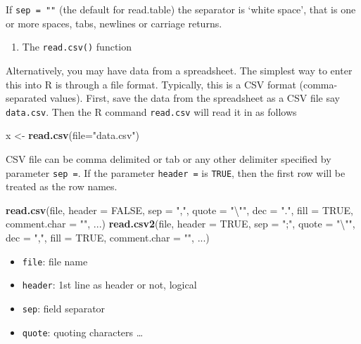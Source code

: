 \documentclass[]{book}
\newenvironment{Shaded}{\begin{snugshade}}{\end{snugshade}}
\newcommand{\KeywordTok}[1]{\textcolor[rgb]{0.13,0.29,0.53}{\textbf{#1}}}
\newcommand{\DataTypeTok}[1]{\textcolor[rgb]{0.13,0.29,0.53}{#1}}
\newcommand{\CharTok}[1]{\textcolor[rgb]{0.31,0.60,0.02}{#1}}
\newcommand{\StringTok}[1]{\textcolor[rgb]{0.31,0.60,0.02}{#1}}
\newcommand{\OtherTok}[1]{\textcolor[rgb]{0.56,0.35,0.01}{#1}}
\newcommand{\NormalTok}[1]{#1}
\providecommand{\tightlist}{%
  \setlength{\itemsep}{0pt}\setlength{\parskip}{0pt}}
\begin{document}
If \texttt{sep\ =\ ""} (the default for read.table) the separator is
`white space', that is one or more spaces, tabs, newlines or carriage
returns.

\begin{enumerate}
\def\labelenumi{\arabic{enumi}.}
\setcounter{enumi}{2}
\tightlist
\item
  The \texttt{read.csv()} function
\end{enumerate}

Alternatively, you may have data from a spreadsheet. The simplest way to
enter this into R is through a file format. Typically, this is a CSV
format (comma-separated values). First, save the data from the
spreadsheet as a CSV file say \texttt{data.csv}. Then the R command
\texttt{read.csv} will read it in as follows

\begin{Shaded}
\begin{Highlighting}[]
\NormalTok{x <-}\StringTok{ }\KeywordTok{read.csv}\NormalTok{(}\DataTypeTok{file=}\StringTok{"data.csv"}\NormalTok{)}
\end{Highlighting}
\end{Shaded}

CSV file can be comma delimited or tab or any other delimiter specified
by parameter \texttt{sep\ =}. If the parameter \texttt{header\ =} is
\texttt{TRUE}, then the first row will be treated as the row names.

\begin{Shaded}
\begin{Highlighting}[]
\KeywordTok{read.csv}\NormalTok{(file, }\DataTypeTok{header =} \OtherTok{FALSE}\NormalTok{, }\DataTypeTok{sep =} \StringTok{","}\NormalTok{, }\DataTypeTok{quote =} \StringTok{"}\CharTok{\textbackslash{}"}\StringTok{"}\NormalTok{, }\DataTypeTok{dec =} \StringTok{"."}\NormalTok{, }
         \DataTypeTok{fill =} \OtherTok{TRUE}\NormalTok{, }\DataTypeTok{comment.char =} \StringTok{""}\NormalTok{, ...) }
\KeywordTok{read.csv2}\NormalTok{(file, }\DataTypeTok{header =} \OtherTok{TRUE}\NormalTok{, }\DataTypeTok{sep =} \StringTok{";"}\NormalTok{, }\DataTypeTok{quote =} \StringTok{"}\CharTok{\textbackslash{}"}\StringTok{"}\NormalTok{, }\DataTypeTok{dec =} \StringTok{","}\NormalTok{, }
          \DataTypeTok{fill =} \OtherTok{TRUE}\NormalTok{, }\DataTypeTok{comment.char =} \StringTok{""}\NormalTok{, ...)          }
\end{Highlighting}
\end{Shaded}

\begin{itemize}
\tightlist
\item
  \texttt{file}: file name
\item
  \texttt{header}: 1st line as header or not, logical
\item
  \texttt{sep}: field separator
\item
  \texttt{quote}: quoting characters \ldots{}
\end{itemize}
\end{document}
